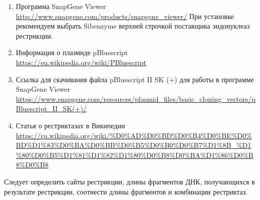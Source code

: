 \begin{enumerate}
    \item Программа SnapGene Viewer \url{http://www.snapgene.com/products/snapgene_viewer/} При установке рекомендуем выбрать Sibenzyme верхней строчкой поставщика эндонуклеаз рестрикции. 
    \item Информация о плазмиде pBluescript\\ \url{https://en.wikipedia.org/wiki/PBluescript}
    \item Ссылка для скачивания файла pBluescript II SK (+) для работы в программе SnapGene Viewer \url{https://www.snapgene.com/resources/plasmid_files/basic_cloning_vectors/pBluescript_II_SK(+)/}
    \item Статья о рестриктазах в Википедии \url{https://ru.wikipedia.org/wiki/%D0%AD%D0%BD%D0%B4%D0%BE%D0%BD%D1%83%D0%BA%D0%BB%D0%B5%D0%B0%D0%B7%D1%8B_%D1%80%D0%B5%D1%81%D1%82%D1%80%D0%B8%D0%BA%D1%86%D0%B8%D0%B8}
\end{enumerate}

\explanationSection

Следует определить сайты рестрикции, длины фрагментов ДНК, получающихся в результате рестрикции, соотнести длины фрагментов и комбинации рестриктаз.

